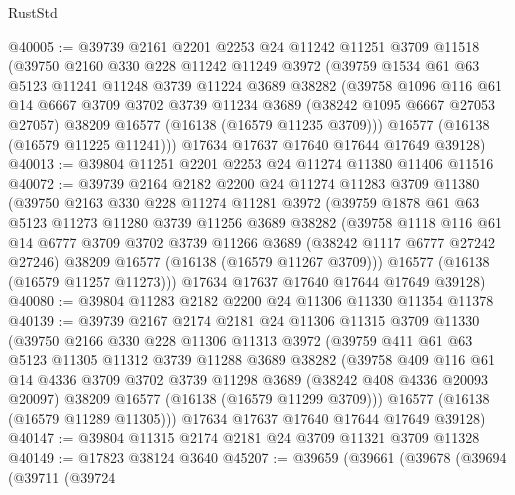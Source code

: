 \begin{lexlean}{RustStd}
\begin{coremodule}
@40005 := @39739
    @2161
    @2201
    @2253
    @24
    @11242
    @11251
    @3709
    @11518
    (@39750
      @2160
      @330
      @228
      @11242
      @11249
      @3972
      (@39759
        @1534
        @61
        @63
        @5123
        @11241
        @11248
        @3739
        @11224
        @3689
        @38282
        (@39758
          @1096
          @116
          @61
          @14
          @6667
          @3709
          @3702
          @3739
          @11234
          @3689
          (@38242 @1095 @6667 @27053 @27057)
          @38209
          @16577
          (@16138 (@16579 @11235 @3709)))
        @16577
        (@16138 (@16579 @11225 @11241)))
      @17634
      @17637
      @17640
      @17644
      @17649
      @39128)
@40013 := @39804 @11251 @2201 @2253 @24 @11274 @11380 @11406 @11516
@40072 := @39739
    @2164
    @2182
    @2200
    @24
    @11274
    @11283
    @3709
    @11380
    (@39750
      @2163
      @330
      @228
      @11274
      @11281
      @3972
      (@39759
        @1878
        @61
        @63
        @5123
        @11273
        @11280
        @3739
        @11256
        @3689
        @38282
        (@39758
          @1118
          @116
          @61
          @14
          @6777
          @3709
          @3702
          @3739
          @11266
          @3689
          (@38242 @1117 @6777 @27242 @27246)
          @38209
          @16577
          (@16138 (@16579 @11267 @3709)))
        @16577
        (@16138 (@16579 @11257 @11273)))
      @17634
      @17637
      @17640
      @17644
      @17649
      @39128)
@40080 := @39804 @11283 @2182 @2200 @24 @11306 @11330 @11354 @11378
@40139 := @39739
    @2167
    @2174
    @2181
    @24
    @11306
    @11315
    @3709
    @11330
    (@39750
      @2166
      @330
      @228
      @11306
      @11313
      @3972
      (@39759
        @411
        @61
        @63
        @5123
        @11305
        @11312
        @3739
        @11288
        @3689
        @38282
        (@39758
          @409
          @116
          @61
          @14
          @4336
          @3709
          @3702
          @3739
          @11298
          @3689
          (@38242 @408 @4336 @20093 @20097)
          @38209
          @16577
          (@16138 (@16579 @11299 @3709)))
        @16577
        (@16138 (@16579 @11289 @11305)))
      @17634
      @17637
      @17640
      @17644
      @17649
      @39128)
@40147 := @39804 @11315 @2174 @2181 @24 @3709 @11321 @3709 @11328
@40149 := @17823 @38124 @3640
@45207 := @39659
    (@39661
      (@39678
        (@39694
          (@39711
            (@39724

\end{coremodule}
\end{lexlean}
